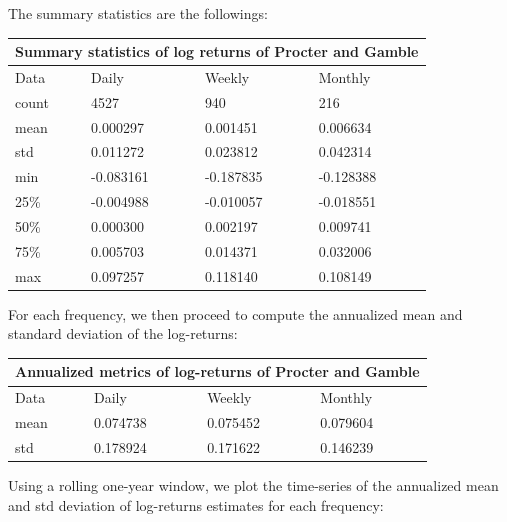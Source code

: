 \documentclass[10pt]{article}
\newenvironment{exercise}[2][Exercise]{\begin{trivlist}
  \item[\hskip \labelsep {\bfseries #1}\hskip \labelsep {\bfseries #2.}]}{\end{trivlist}}
\begin{document}
\begin{exercise}{4}
	\smallbreak
	
	The summary statistics are the followings:
	
	\bigbreak	
	
	\begin{tabular}{ |p{3cm}||p{3cm}|p{3cm}|p{3cm}|  }
 		\hline
		\multicolumn{4}{|c|}{Summary statistics of log returns of Procter and Gamble} \\
		\hline
		Data & Daily & Weekly & Monthly\\
 		\hline
 		count   &  4527 & 940 & 216\\
 		mean & 0.000297 & 0.001451 & 0.006634\\
 		std & 0.011272 & 0.023812 & 0.042314\\
 		min & -0.083161 & -0.187835 & -0.128388\\
 		25\% & -0.004988 & -0.010057 & -0.018551\\
 		50\% & 0.000300 & 0.002197 & 0.009741\\
 		75\% & 0.005703 & 0.014371 & 0.032006\\
 		max & 0.097257 & 0.118140 & 0.108149\\
 		\hline
	\end{tabular}
	
	\bigbreak	
	
	For each frequency, we then proceed to compute the annualized mean and standard deviation of the log-returns:
	
	\bigbreak
	
	\begin{tabular}{ |p{3cm}||p{3cm}|p{3cm}|p{3cm}|  }
		\hline
	 	\multicolumn{4}{|c|}{Annualized metrics of log-returns of Procter and Gamble} \\
	 	\hline
	 	Data & Daily & Weekly & Monthly\\
 		\hline
 		mean  &  0.074738 & 0.075452 & 0.079604\\
 		std & 0.178924 & 0.171622 & 0.146239\\
 		\hline
	\end{tabular}
	
	\bigbreak	
	
	Using a rolling one-year window, we plot the time-series of the annualized mean and std deviation of log-returns estimates for each frequency:
	
	\begin{figure}[H]
	

\end{figure}
\end{exercise}
\end{document}
